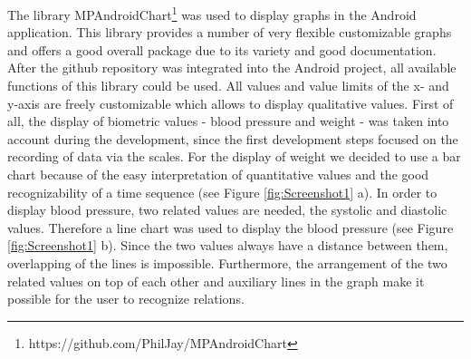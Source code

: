 The library \glqq{}MPAndroidChart\grqq{}\footnote{https://github.com/PhilJay/MPAndroidChart} was used to display graphs in the Android application. This library provides a number of very flexible customizable graphs and offers a good overall package due to its variety and good documentation. After the github repository was integrated into the Android project, all available functions of this library could be used. All values and value limits of the x- and y-axis are freely customizable which allows to display qualitative values. First of all, the display of biometric values - blood pressure and weight - was taken into account during the development, since the first development steps focused on the recording of data via the scales. For the display of weight we decided to use a bar chart because of the easy interpretation of quantitative values and the good recognizability of a time sequence (see Figure \ref{fig:Screenshot1} a). In order to display blood pressure, two related values are needed, the systolic and diastolic values. Therefore a line chart was used to display the blood pressure (see Figure \ref{fig:Screenshot1} b). Since the two values always have a distance between them, overlapping of the lines is impossible. Furthermore, the arrangement of the two related values on top of each other and auxiliary lines in the graph make it possible for the user to recognize relations.

